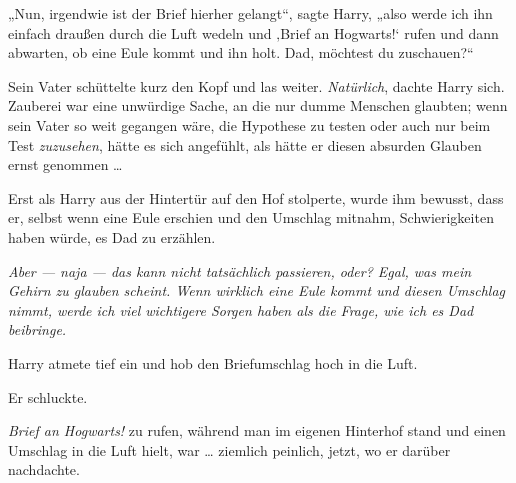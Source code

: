 „Nun, irgendwie ist der Brief hierher gelangt“, sagte Harry, „also werde ich ihn einfach draußen durch die Luft wedeln und ‚Brief an Hogwarts!‘ rufen und dann abwarten, ob eine Eule kommt und ihn holt. Dad, möchtest du zuschauen?“

Sein Vater schüttelte kurz den Kopf und las weiter. \emph{Natürlich}, dachte Harry sich. Zauberei war eine unwürdige Sache, an die nur dumme Menschen glaubten; wenn sein Vater so weit gegangen wäre, die Hypothese zu testen oder auch nur beim Test \emph{zuzusehen}, hätte es sich angefühlt, als hätte er diesen absurden Glauben ernst genommen …

Erst als Harry aus der Hintertür auf den Hof stolperte, wurde ihm bewusst, dass er, selbst wenn eine Eule erschien und den Umschlag mitnahm, Schwierigkeiten haben würde, es Dad zu erzählen.

\emph{Aber — naja — das kann nicht \emph{tatsächlich} passieren, oder? Egal, was mein Gehirn zu glauben scheint. Wenn wirklich eine Eule kommt und diesen Umschlag nimmt, werde ich viel wichtigere Sorgen haben als die Frage, wie ich es Dad beibringe.}

Harry atmete tief ein und hob den Briefumschlag hoch in die Luft.

Er schluckte.

\emph{Brief an Hogwarts!} zu rufen, während man im eigenen Hinterhof stand und einen Umschlag in die Luft hielt, war … ziemlich peinlich, jetzt, wo er darüber nachdachte.

